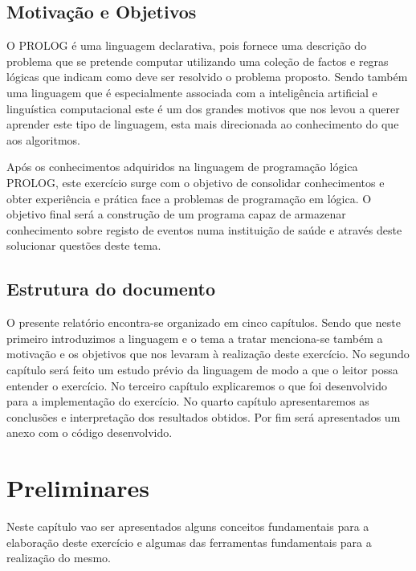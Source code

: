 \section{Motivação e Objetivos}
\label{p1:MotivObj}
O PROLOG é uma linguagem declarativa, pois fornece uma descrição do problema que se pretende computar utilizando uma coleção de factos e regras lógicas que indicam como deve ser resolvido o problema proposto. Sendo também uma linguagem que é especialmente associada com a inteligência artificial e linguística computacional este é um dos grandes motivos que nos levou a querer aprender este tipo de linguagem, esta mais direcionada ao conhecimento do que aos algoritmos. 


Após os conhecimentos adquiridos na linguagem de programação lógica PROLOG, este exercício surge com o objetivo de consolidar conhecimentos e obter experiência e prática face a problemas de programação em lógica. O objetivo final será a construção de um programa capaz de armazenar conhecimento sobre registo de eventos numa instituição de saúde e através deste solucionar questões deste tema.



\section{Estrutura do documento}
\label{p1:Estrutura}
O presente relatório encontra-se organizado em cinco capítulos. Sendo que neste primeiro introduzimos a linguagem e o tema a tratar menciona-se também a motivação e os objetivos que nos levaram à realização deste exercício. 
No segundo capítulo será feito um estudo prévio da linguagem de modo a que o leitor possa entender o exercício. No terceiro capítulo explicaremos o que foi desenvolvido para a implementação do exercício. No quarto capítulo apresentaremos as conclusões e interpretação dos resultados obtidos. Por fim será apresentados um anexo com o código desenvolvido. 




\chapter{Preliminares}
\label{cap:p2}
Neste capítulo vao ser apresentados alguns conceitos fundamentais para a elaboração deste exercício e algumas das ferramentas fundamentais para a realização do mesmo.



